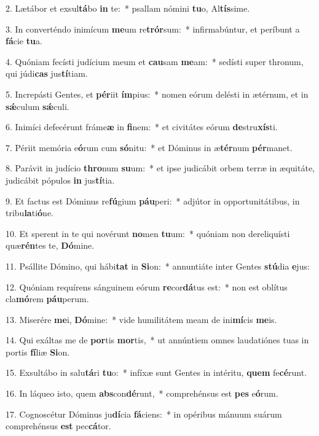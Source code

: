 2. Lætábor et exsul\textbf{tá}bo \textbf{in} te:~*  psallam nómini \textbf{tu}o, Al\textbf{tís}sime.\

3. In converténdo inimícum \textbf{me}um re\textbf{trór}sum:~*  infirmabúntur, et períbunt a \textbf{fá}cie \textbf{tu}a.\

4. Quóniam fecísti judícium meum et \textbf{cau}sam \textbf{me}am:~*  sedísti super thronum, qui júdi\textbf{cas} jus\textbf{tí}tiam.\

5. Increpásti Gentes, et \textbf{pér}iit \textbf{ím}pius:~*  nomen eórum delésti in ætérnum, et in \textbf{sǽ}culum \textbf{sǽ}culi.\

6. Inimíci defecérunt fráme\textbf{æ} in \textbf{fi}nem:~*  et civitátes eórum \textbf{de}stru\textbf{xís}ti.\

7. Périit memória e\textbf{ó}rum cum \textbf{só}nitu:~*  et Dóminus in æ\textbf{tér}num \textbf{pér}manet.\

8. Parávit in judício \textbf{thro}num \textbf{su}um:~*  et ipse judicábit orbem terræ in æquitáte, judicábit pópulos \textbf{in} jus\textbf{tí}tia.\

9. Et factus est Dóminus re\textbf{fú}gium \textbf{páu}peri:~*  adjútor in opportunitátibus, in tribu\textbf{la}ti\textbf{ó}ne.\

10. Et sperent in te qui novérunt \textbf{no}men \textbf{tu}um:~*  quóniam non dereliquísti quæ\textbf{rén}tes te, \textbf{Dó}mine.\

11. Psállite Dómino, qui hábi\textbf{tat} in \textbf{Si}on:~*  annuntiáte inter Gentes \textbf{stú}dia \textbf{e}jus:\

12. Quóniam requírens sánguinem eórum \textbf{re}cor\textbf{dá}tus est:~*  non est oblítus cla\textbf{mó}rem \textbf{páu}perum.\

13. Miserére \textbf{me}i, \textbf{Dó}mine:~*  vide humilitátem meam de ini\textbf{mí}cis \textbf{me}is.\

14. Qui exáltas me de \textbf{por}tis \textbf{mor}tis,~*  ut annúntiem omnes laudatiónes tuas in portis \textbf{fí}liæ \textbf{Si}on.\

15. Exsultábo in salu\textbf{tá}ri \textbf{tu}o:~*  infíxæ sunt Gentes in intéritu, \textbf{quem} fe\textbf{cé}runt.\

16. In láqueo isto, quem \textbf{abs}con\textbf{dé}runt,~*  comprehénsus est \textbf{pes} e\textbf{ó}rum.\

17. Cognoscétur Dóminus ju\textbf{dí}cia \textbf{fá}ciens:~*  in opéribus mánuum suárum comprehénsus \textbf{est} pec\textbf{cá}tor.\

